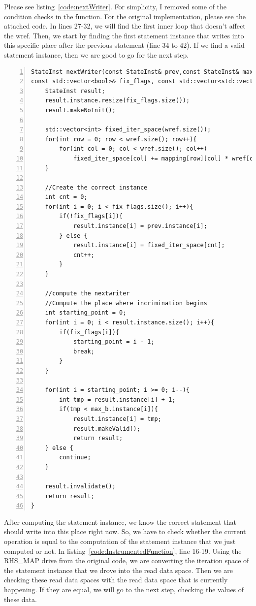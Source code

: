 \documentclass[letterpaper,12pt]{article}
\begin{document}
	Please see listing~\ref{code:nextWriter}. For simplicity, I removed some of the condition checks in the function. For the original implementation, please see the attached code. In lines 27-32, we will find the first inner loop that doesn't affect the wref. Then, we start by finding the first statement instance that writes into this specific place after the previous statement (line 34 to 42). If we find a valid statement instance, then we are good to go for the next step. 
		 
		 
\begin{lstlisting}[caption={nextWriter function}, label={code:nextWriter}, numbers=left, captionpos=b, stepnumber=1]
StateInst nextWriter(const StateInst& prev,const StateInst& max_b,const std::vector<int>& wref,
const std::vector<bool>& fix_flags, const std::vector<std::vector<int>>& mapping){
	StateInst result;
	result.instance.resize(fix_flags.size());
	result.makeNoInit();

	std::vector<int> fixed_iter_space(wref.size());
	for(int row = 0; row < wref.size(); row++){
		for(int col = 0; col < wref.size(); col++)
			fixed_iter_space[col] += mapping[row][col] * wref[col];
	}

	//Create the correct instance
	int cnt = 0;
	for(int i = 0; i < fix_flags.size(); i++){
		if(!fix_flags[i]){
			result.instance[i] = prev.instance[i];
		} else {
			result.instance[i] = fixed_iter_space[cnt];
			cnt++;
		}
	}

	//compute the nextwriter
	//Compute the place where incrimination begins
	int starting_point = 0;
	for(int i = 0; i < result.instance.size(); i++){
		if(fix_flags[i]){
			starting_point = i - 1;
			break;
		}
	}
	
	for(int i = starting_point; i >= 0; i--){
		int tmp = result.instance[i] + 1;
		if(tmp < max_b.instance[i]){
			result.instance[i] = tmp;
			result.makeValid();
			return result;
	} else {
		continue;
	}

	result.invalidate();
	return result;
}
\end{lstlisting}

		 After computing the statement instance, we know the correct statement that should write into this place right now. So, we have to check whether the current operation is equal to the computation of the statement instance that we just computed or not. In listing~\ref{code:InstrumentedFunction}, line 16-19. Using the RHS\_MAP drive from the original code, we are converting the iteration space of the statement instance that we drove into the read data space. Then we are checking these read data spaces with the read data space that is currently happening. If they are equal, we will go to the next step, checking the values of these data.
	
\end{document}
